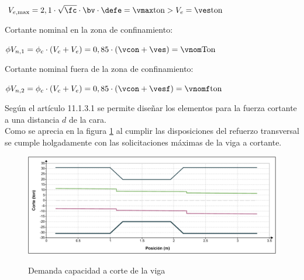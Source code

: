 \begin{center}
$\displaystyle V_{e, \max }=2,1 \cdot \sqrt{\fc} \cdot \bv \cdot \defe=\vmax\mathrm{ton}>V_{e}=\ves\mathrm{ton}$ 
\end{center}
Cortante nominal en la zona de confinamiento:
\begin{center}
$\displaystyle \phi V_{n,1}=\phi_{c} \cdot\left(V_{c}+V_{e}\right)=0,85 \cdot(\vcon+\ves)=\vnom\mathrm{Ton}$
\end{center}
Cortante nominal fuera de la zona de confinamiento:
\begin{center}
$\displaystyle \phi V_{n,2}=\phi_{c} \cdot\left(V_{c}+V_{e}\right)=0,85 \cdot(\vcon+\vesf)=\vnomf\mathrm{ton}$
\end{center}
Según el artículo 11.1.3.1 se permite diseñar los elementos para la fuerza cortante a una distancia $d$ de la cara.\\
Como se aprecia en la figura \ref{corcap} al cumplir las disposiciones del refuerzo transversal se cumple holgadamente con las solicitaciones máximas de la viga a cortante.
\begin{figure}[h!]
    \centering
    \caption{Demanda capacidad a corte de la viga}
    \includegraphics[scale=0.7]{IMAGENES/capcor.pdf}
    \label{corcap}
\end{figure}
